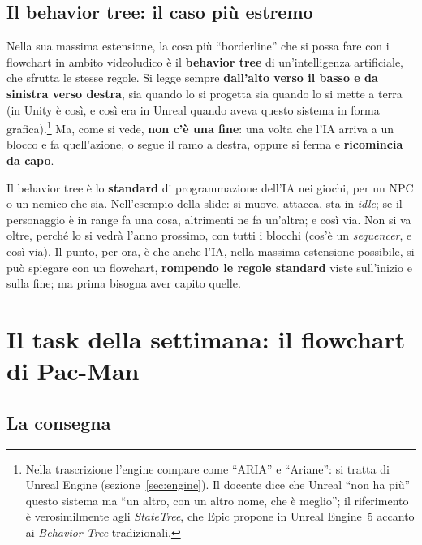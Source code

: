 \subsection{Il behavior tree: il caso più estremo}

Nella sua massima estensione, la cosa più ``borderline'' che si possa fare
con i flowchart in ambito videoludico è il \textbf{behavior tree} di
un'intelligenza artificiale, che sfrutta le stesse regole. Si legge sempre
\textbf{dall'alto verso il basso e da sinistra verso destra}, sia quando lo si
progetta sia quando lo si mette a terra (in Unity è così, e così era in
Unreal quando aveva questo sistema in forma grafica).\footnote{Nella
trascrizione l'engine compare come ``ARIA'' e ``Ariane'': si tratta di Unreal
Engine (sezione~\ref{sec:engine}). Il docente dice che Unreal ``non ha più''
questo sistema ma ``un altro, con un altro nome, che è meglio''; il
riferimento è verosimilmente agli \emph{StateTree}, che Epic propone in
Unreal Engine~5 accanto ai \emph{Behavior Tree} tradizionali.} Ma, come si
vede, \textbf{non c'è una fine}: una volta che l'IA arriva a un blocco e fa
quell'azione, o segue il ramo a destra, oppure si ferma e \textbf{ricomincia
da capo}.

Il behavior tree è lo \textbf{standard} di programmazione dell'IA nei giochi,
per un NPC o un nemico che sia. Nell'esempio della slide: si muove, attacca,
sta in \emph{idle}; se il personaggio è in range fa una cosa, altrimenti ne fa
un'altra; e così via. Non si va oltre, perché lo si vedrà l'anno prossimo,
con tutti i blocchi (cos'è un \emph{sequencer}, e così via). Il punto, per
ora, è che anche l'IA, nella massima estensione possibile, si può spiegare
con un flowchart, \textbf{rompendo le regole standard} viste sull'inizio e
sulla fine; ma prima bisogna aver capito quelle.

\section{Il task della settimana: il flowchart di Pac-Man}
\label{sec:task-gd6}



\subsection{La consegna}

